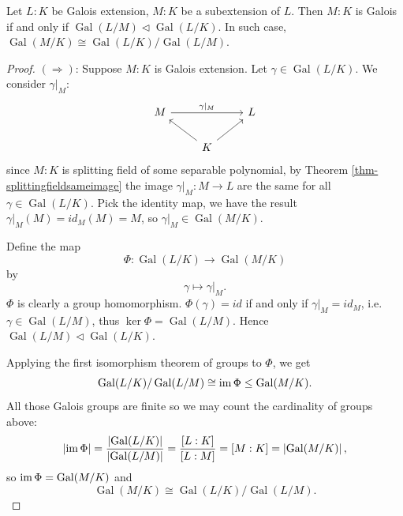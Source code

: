 \begin{theorem}\label{thm-FTGT-2}
    Let $L:K$ be Galois extension, $M:K$ be a subextension of $L$. Then $M:K$ is Galois if and only if $\operatorname{Gal}(L /M)\lhd \operatorname{Gal}(L /K)$. In such case, $\operatorname{Gal}(M /K)\cong \operatorname{Gal}(L /K) /\operatorname{Gal}(L /M)$. 
\end{theorem}

\begin{proof}
    $(\Rightarrow)$: Suppose $M :K$ is Galois extension. Let $\gamma\in \operatorname{Gal}(L /K)$. We consider $\gamma|_{M}$: 
    \[
        \begin{tikzcd}
            M && L \\
            & K
            \arrow["{\gamma|_{M}}", from=1-1, to=1-3]
            \arrow[from=2-2, to=1-1]
            \arrow[from=2-2, to=1-3]
        \end{tikzcd}
    \]
    since $M :K$ is splitting field of some separable polynomial, by Theorem \ref{thm-splittingfieldsameimage} the image $\gamma|_{M}:M\to L$ are the same for all $\gamma\in \operatorname{Gal}(L /K)$. Pick the identity map, we have the result $\gamma|_{M}(M)=id_{M}(M)=M$, so $\gamma|_{M}\in \operatorname{Gal}(M/K)$. 

    Define the map
    \[
    \Phi: \operatorname{Gal}(L /K)\to \operatorname{Gal}(M /K)
    \]
    by \[ 
    \gamma\mapsto \gamma|_{M}.
    \] 
    $\Phi$ is clearly a group homomorphism. $\Phi(\gamma)=id$ if and only if $\gamma|_{M}=id_{M}$, i.e. $\gamma\in \operatorname{Gal}(L /M)$, thus $\ker \Phi=\operatorname{Gal}(L /M)$. Hence $\operatorname{Gal}(L /M)\lhd \operatorname{Gal}(L/K)$. 

    Applying the first isomorphism theorem of groups to $\Phi$, we get 
    \[
    \operatorname{Gal}(L /K)/\operatorname{Gal}(L /M) \cong \mathop{\mathrm{im}} \Phi \leq \operatorname{Gal}(M/K). 
    \]
    All those Galois groups are finite so we may count the cardinality of groups above: 
    \[
    \left| \mathop{\mathrm{im}} \Phi \right| =\frac{\left| \operatorname{Gal}(L /K) \right| }{\left|\operatorname{Gal}(L /M)\right|}=\frac{[L:K]}{[L:M]}=[M:K]=\left| \operatorname{Gal}(M /K) \right|,
    \]
    so $\mathop{\mathrm{im}} \Phi=\operatorname{Gal}(M /K)$ and 
    \[
    \operatorname{Gal}(M /K)\cong \operatorname{Gal}(L /K)/\operatorname{Gal}(L /M). 
    \]


\end{proof}
